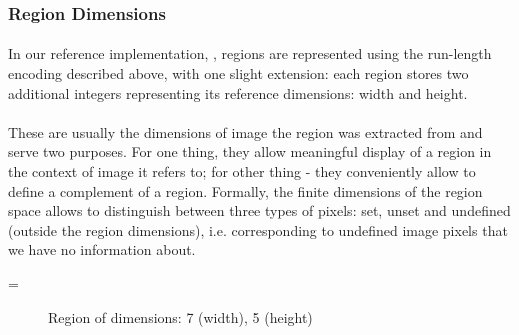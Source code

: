 \subsubsection{Region Dimensions}

\paragraph*{}
In our reference implementation, \studio, regions are represented using the run-length encoding described above, with one slight extension: each region stores two additional integers representing its reference dimensions: width and height.

\paragraph*{}
These are usually the dimensions of image the region was extracted from and serve two purposes. For one thing, they allow meaningful display of a region in the context of image it refers to; for other thing - they conveniently allow to define a complement of a region. Formally, the finite dimensions of the region space allows to distinguish between three types of pixels: set, unset and undefined (outside the region dimensions), i.e. corresponding to undefined image pixels that we have no information about.

\newarray\regionDimensions
{}

\dataheight=\gridwidth

\begin{figure}[h!]
\centering

\caption{Region of dimensions: 7 (width), 5 (height)}
\label{tab:RegionDimensions}
\end{figure}